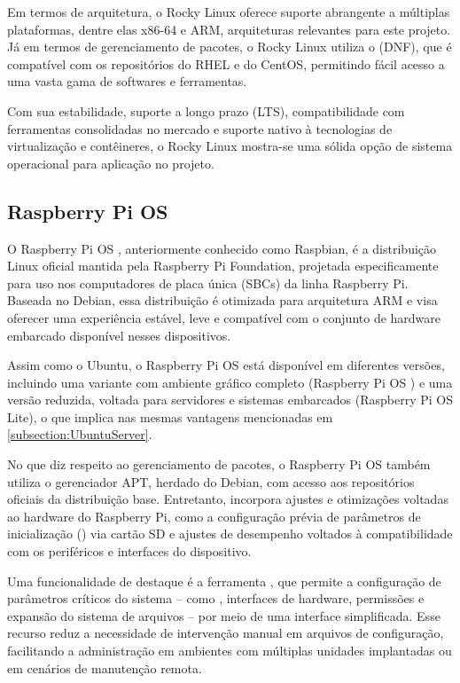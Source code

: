 Em termos de arquitetura, o Rocky Linux oferece suporte abrangente a múltiplas plataformas, dentre elas x86-64 e ARM, arquiteturas relevantes para este projeto. Já em termos de gerenciamento de pacotes, o Rocky Linux utiliza o  (DNF), que é compatível com os repositórios do RHEL e do CentOS, permitindo fácil acesso a uma vasta gama de softwares e ferramentas.

Com sua estabilidade, suporte a longo prazo (LTS), compatibilidade com ferramentas consolidadas no mercado e suporte nativo à tecnologias de virtualização e contêineres, o Rocky Linux mostra-se uma sólida opção de sistema operacional para aplicação no projeto.

\subsection{Raspberry Pi OS}
\label{subsection:RaspberryPiOS}

O Raspberry Pi OS \citep{raspisftwr2025}, anteriormente conhecido como Raspbian, é a distribuição Linux oficial mantida pela Raspberry Pi Foundation, projetada especificamente para uso nos computadores de placa única (SBCs) da linha Raspberry Pi. Baseada no Debian, essa distribuição é otimizada para arquitetura ARM e visa oferecer uma experiência estável, leve e compatível com o conjunto de hardware embarcado disponível nesses dispositivos.

Assim como o Ubuntu, o Raspberry Pi OS está disponível em diferentes versões, incluindo uma variante com ambiente gráfico completo (Raspberry Pi OS ) e uma versão reduzida, voltada para servidores e sistemas embarcados (Raspberry Pi OS Lite), o que implica nas mesmas vantagens mencionadas em \ref{subsection:UbuntuServer}.

No que diz respeito ao gerenciamento de pacotes, o Raspberry Pi OS também utiliza o gerenciador APT, herdado do Debian, com acesso aos repositórios oficiais da distribuição base. Entretanto, incorpora ajustes e otimizações voltadas ao hardware do Raspberry Pi, como a configuração prévia de parâmetros de inicialização () via cartão SD e ajustes de desempenho voltados à compatibilidade com os periféricos e interfaces do dispositivo.

Uma funcionalidade de destaque é a ferramenta , que permite a configuração de parâmetros críticos do sistema -- como , interfaces de hardware, permissões e expansão do sistema de arquivos -- por meio de uma interface simplificada. Esse recurso reduz a necessidade de intervenção manual em arquivos de configuração, facilitando a administração em ambientes com múltiplas unidades implantadas ou em cenários de manutenção remota.

